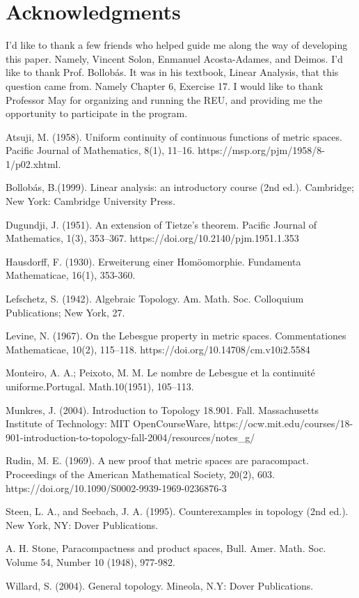 \documentclass[openany, amssymb, psamsfonts]{amsart}
\theoremstyle{definition}
\numberwithin{equation}{section}
\begin{document}
\section*{Acknowledgments}  I'd like to thank a few friends who helped guide me along the way of developing this paper. Namely, Vincent Solon, Enmanuel Acosta-Adames, and Deimos. I'd like to thank Prof. Bollob{\'a}s. It was in his textbook, Linear Analysis, that this question came from. Namely Chapter 6, Exercise 17. I would like to thank Professor May for organizing and running the REU,
and providing me the opportunity to participate in the program.
 
\begin{thebibliography}{9}
   Atsuji, M. (1958). Uniform continuity of continuous functions of metric spaces. Pacific Journal of Mathematics, 8(1), 11–16. https://msp.org/pjm/1958/8-1/p02.xhtml. 

   Bollob{\'a}s, B.(1999). Linear analysis: an introductory course (2nd ed.). Cambridge; New York: Cambridge University Press.

   Dugundji, J. (1951). An extension of Tietze’s theorem. Pacific Journal of Mathematics, 1(3), 353–367. https://doi.org/10.2140/pjm.1951.1.353

   Hausdorff, F. (1930). Erweiterung einer Hom{\"o}omorphie. Fundamenta Mathematicae, 16(1), 353-360.

   Lefschetz, S. (1942). Algebraic Topology. Am. Math. Soc. Colloquium Publications; New York, 27.

   Levine, N. (1967). On the Lebesgue property in metric spaces. Commentationes Mathematicae, 10(2), 115–118. https://doi.org/10.14708/cm.v10i2.5584

   Monteiro, A. A.; Peixoto, M. M. Le nombre de Lebesgue et la continuité uniforme.Portugal. Math.10(1951), 105–113.

   Munkres, J. (2004). Introduction to Topology 18.901. Fall. Massachusetts Institute of Technology: MIT OpenCourseWare, https://ocw.mit.edu/courses/18-901-introduction-to-topology-fall-2004/resources/notes\_g/

   Rudin, M. E. (1969). A new proof that metric spaces are paracompact. Proceedings of the American Mathematical Society, 20(2), 603. https://doi.org/10.1090/S0002-9939-1969-0236876-3

   Steen, L. A., and Seebach, J. A. (1995). Counterexamples in topology (2nd ed.). New York, NY: Dover Publications. 

   A. H. Stone, Paracompactness and product spaces, Bull. Amer. Math. Soc. Volume 54, Number 10 (1948), 977-982. 

   Willard, S. (2004). General topology. Mineola, N.Y: Dover Publications.
\end{thebibliography}
\end{document}
